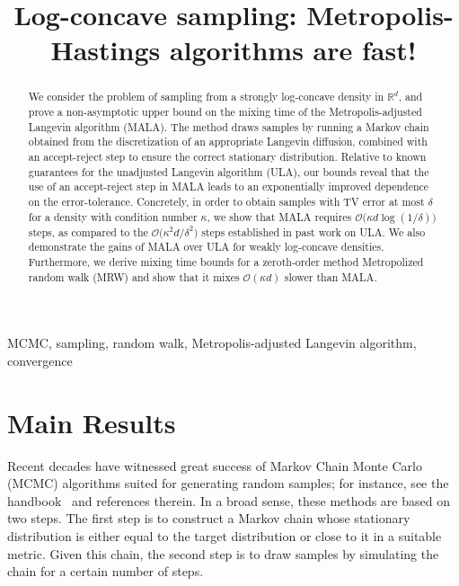 \documentclass[final, 12pt]{colt2018} %
\title[MALA]{Log-concave sampling: Metropolis-Hastings algorithms are fast!}
\begin{document}
\maketitle

\begin{abstract}
We consider the problem of sampling from a strongly log-concave
density in $\mathbb{R}^d$, and prove a non-asymptotic upper bound on
the mixing time of the Metropolis-adjusted Langevin algorithm (MALA).
The method draws samples by running a Markov chain obtained from the
discretization of an appropriate Langevin diffusion, combined with an
accept-reject step to ensure the correct stationary distribution.
Relative to known guarantees for the unadjusted Langevin algorithm
(ULA), our bounds reveal that the use of an accept-reject step in MALA
leads to an exponentially improved dependence on the error-tolerance.
Concretely, in order to obtain samples with TV error at most $\delta$
for a density with condition number $\kappa$, we show that MALA
requires $\mathcal{O} \big(\kappa d \log(1/\delta) \big)$ steps, as
compared to the $\mathcal{O} \big(\kappa^2 d/\delta^2 \big)$ steps
established in past work on ULA.  We also demonstrate the gains of
MALA over ULA for weakly log-concave densities.  Furthermore, we
derive mixing time bounds for a zeroth-order method Metropolized
random walk (MRW) and show that it mixes $\mathcal{O}(\kappa d)$
slower than MALA.
\end{abstract}
\let\thefootnote\relax{}

\begin{keywords}
MCMC, sampling, random walk, Metropolis-adjusted Langevin algorithm, convergence
\end{keywords}

\section{Main Results}
\label{sec:main_results}
Recent decades have witnessed great success of Markov Chain Monte
Carlo (MCMC) algorithms suited for generating random samples; for
instance, see the handbook~\citep{brooks2011handbook} and references
therein. In a broad sense, these methods are based on two steps.  The
first step is to construct a Markov chain whose stationary
distribution is either equal to the target distribution or close to it
in a suitable metric.  Given this chain, the second step is to draw
samples by simulating the chain for a certain number of steps.
\end{document}

